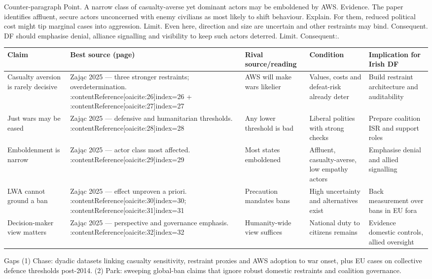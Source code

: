 Counter-paragraph
Point. A narrow class of casualty-averse yet dominant actors may be emboldened by AWS.
Evidence. The paper identifies affluent, secure actors unconcerned with enemy civilians as most likely to shift behaviour.
Explain. For them, reduced political cost might tip marginal cases into aggression.
Limit. Even here, direction and size are uncertain and other restraints may bind.
Consequent. DF should emphasise denial, alliance signalling and visibility to keep such actors deterred. Limit. Consequent:.


\begin{tabular}{p{3.2cm}p{4.2cm}p{3.6cm}p{3.2cm}p{4.2cm}}
	\textbf{Claim} & \textbf{Best source (page)} & \textbf{Rival source/reading} & \textbf{Condition} & \textbf{Implication for Irish DF}\\\hline
	Casualty aversion is rarely decisive & Zając 2025 — three stronger restraints; overdetermination. {\small :contentReference[oaicite:26]{index=26} {\tiny +} :contentReference[oaicite:27]{index=27}} & AWS will make wars likelier & Values, costs and defeat-risk already deter & Build restraint architecture and auditability \\
	Just wars may be eased & Zając 2025 — defensive and humanitarian thresholds. {\small :contentReference[oaicite:28]{index=28}} & Any lower threshold is bad & Liberal polities with strong checks & Prepare coalition ISR and support roles \\
	Emboldenment is narrow & Zając 2025 — actor class most affected. {\small :contentReference[oaicite:29]{index=29}} & Most states emboldened & Affluent, casualty-averse, low empathy actors & Emphasise denial and allied signalling \\
	LWA cannot ground a ban & Zając 2025 — effect unproven a priori. {\small :contentReference[oaicite:30]{index=30}; :contentReference[oaicite:31]{index=31}} & Precaution mandates bans & High uncertainty and alternatives exist & Back measurement over bans in EU fora \\
	Decision-maker view matters & Zając 2025 — perspective and governance emphasis. {\small :contentReference[oaicite:32]{index=32}} & Humanity-wide view suffices & National duty to citizens remains & Evidence domestic controls, allied oversight \\\hline
\end{tabular}

Gaps
(1) Chase: dyadic datasets linking casualty sensitivity, restraint proxies and AWS adoption to war onset, plus EU cases on collective defence thresholds post-2014.
(2) Park: sweeping global-ban claims that ignore robust domestic restraints and coalition governance.

